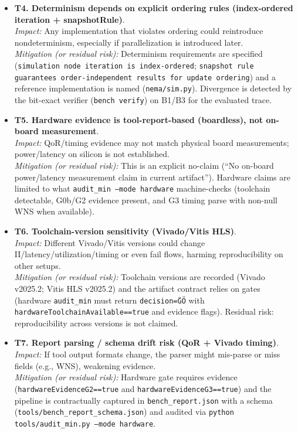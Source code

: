 \begin{itemize}
\item \textbf{T4. Determinism depends on explicit ordering rules (index-ordered iteration + snapshotRule)}.\\
\textit{Impact:} Any implementation that violates ordering could reintroduce nondeterminism, especially if parallelization is introduced later.\\
\textit{Mitigation (or residual risk):} Determinism requirements are specified (\texttt{simulation node iteration is index-ordered}; \texttt{snapshot rule guarantees order-independent results for update ordering}) and a reference implementation is named (\texttt{nema/sim.py}). Divergence is detected by the bit-exact verifier (\texttt{bench verify}) on B1/B3 for the evaluated trace.

\item \textbf{T5. Hardware evidence is tool-report-based (boardless), not on-board measurement}.\\
\textit{Impact:} QoR/timing evidence may not match physical board measurements; power/latency on silicon is not established.\\
\textit{Mitigation (or residual risk):} This is an explicit no-claim (``No on-board power/latency measurement claim in current artifact''). Hardware claims are limited to what \texttt{audit\_min --mode hardware} machine-checks (toolchain detectable, G0b/G2 evidence present, and G3 timing parse with non-null WNS when available).

\item \textbf{T6. Toolchain-version sensitivity (Vivado/Vitis HLS)}.\\
\textit{Impact:} Different Vivado/Vitis versions could change II/latency/utilization/timing or even fail flows, harming reproducibility on other setups.\\
\textit{Mitigation (or residual risk):} Toolchain versions are recorded (Vivado v2025.2; Vitis HLS v2025.2) and the artifact contract relies on gates (hardware \texttt{audit\_min} must return \texttt{decision=\"GO\"} with \texttt{hardwareToolchainAvailable==true} and evidence flags). Residual risk: reproducibility across versions is not claimed.

\item \textbf{T7. Report parsing / schema drift risk (QoR + Vivado timing)}.\\
\textit{Impact:} If tool output formats change, the parser might mis-parse or miss fields (e.g., WNS), weakening evidence.\\
\textit{Mitigation (or residual risk):} Hardware gate requires evidence (\texttt{hardwareEvidenceG2==true} and \texttt{hardwareEvidenceG3==true}) and the pipeline is contractually captured in \texttt{bench\_report.json} with a schema (\texttt{tools/bench\_report\_schema.json}) and audited via \texttt{python tools/audit\_min.py --mode hardware}.


\end{itemize}
